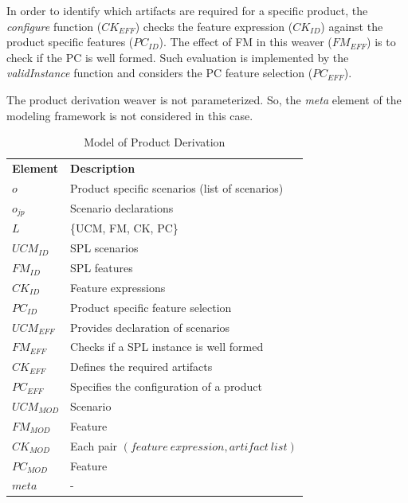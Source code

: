 \documentclass{acm_proc_article-sp}
\begin{document}
In order to identify which artifacts are required for a specific product, the \emph{configure} function ($CK_{EFF}$) checks the feature expression ($CK_{ID}$) against the product specific features ($PC_{ID}$). The effect of FM in this weaver ($FM_{EFF}$) is to check if the PC is well formed. Such evaluation is implemented by the \emph{validInstance} function and considers the PC feature selection ($PC_{EFF}$). 

The product derivation weaver is not parameterized. So, the \emph{meta} element of the modeling framework is not considered in this case.   

\begin{table}[bh]
\begin{center}
\caption{Model of Product Derivation} \label{tab:pd-weaver}
\begin{tabular}{p{0.6in}p{2.4in}}
   \hline\noalign{\smallskip}
  {\bf Element} & {\bf Description} \\
   \noalign{\smallskip}
   \hline
   \noalign{\smallskip}
   $o$               & Product specific scenarios (list of scenarios) \\ 
   $o_{jp}$        & Scenario declarations \\ 
   $L$               & \{UCM, FM, CK, PC\} \\ 
   $UCM_{ID}$ & SPL scenarios \\ 
   $FM_{ID}$    & SPL features \\ 
   $CK_{ID}$    & Feature expressions \\  
   $PC_{ID}$    & Product specific feature selection \\ 
   $UCM_{EFF}$ & Provides declaration of scenarios \\  
   $FM_{EFF}$    & Checks if a SPL instance is well formed \\ 
   $CK_{EFF}$    & Defines the required artifacts  \\ 
   $PC_{EFF}$    & Specifies the configuration of a product \\
   $UCM_{MOD}$ & Scenario \\  
   $FM_{MOD}$   & Feature \\ 
   $CK_{MOD}$    & Each pair $(feature\ expression, artifact\ list)$  \\ 
   $PC_{MOD}$    & Feature \\
   $meta$         & - \\ 
  \hline
  \end{tabular}
\end{center}
\end{table}
\end{document}
